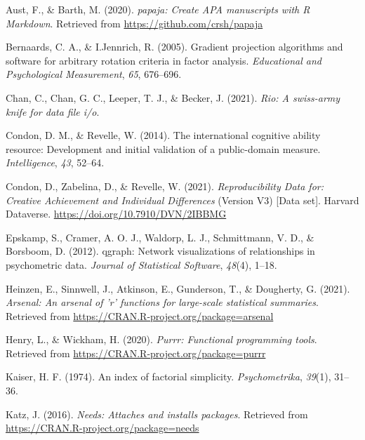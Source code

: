 \documentclass[
  english,
  man]{apa6}
\newlength{\cslhangindent}
\newlength{\cslentryspacingunit} %
\newenvironment{CSLReferences}[2] %
 {%
  \setlength{\parindent}{0pt}
  \ifodd #1
  \let\oldpar\par
  \def\par{\hangindent=\cslhangindent\oldpar}
  \fi
  \setlength{\parskip}{#2\cslentryspacingunit}
 }%
 {}
\begin{document}
\hypertarget{refs}{}
\begin{CSLReferences}{1}{0}
\leavevmode{}%
Aust, F., \& Barth, M. (2020). \emph{{papaja}: {Create} {APA} manuscripts with {R Markdown}}. Retrieved from \url{https://github.com/crsh/papaja}

\leavevmode{}%
Bernaards, C. A., \& I.Jennrich, R. (2005). Gradient projection algorithms and software for arbitrary rotation criteria in factor analysis. \emph{Educational and Psychological Measurement}, \emph{65}, 676--696.

\leavevmode{}%
Chan, C., Chan, G. C., Leeper, T. J., \& Becker, J. (2021). \emph{Rio: A swiss-army knife for data file i/o}.

\leavevmode{}%
Condon, D. M., \& Revelle, W. (2014). The international cognitive ability resource: Development and initial validation of a public-domain measure. \emph{Intelligence}, \emph{43}, 52--64.

\leavevmode{}%
Condon, D., Zabelina, D., \& Revelle, W. (2021). \emph{{Reproducibility Data for: Creative Achievement and Individual Differences}} (Version V3) {[}Data set{]}. Harvard Dataverse. \url{https://doi.org/10.7910/DVN/2IBBMG}

\leavevmode{}%
Epskamp, S., Cramer, A. O. J., Waldorp, L. J., Schmittmann, V. D., \& Borsboom, D. (2012). {qgraph}: Network visualizations of relationships in psychometric data. \emph{Journal of Statistical Software}, \emph{48}(4), 1--18.

\leavevmode{}%
Heinzen, E., Sinnwell, J., Atkinson, E., Gunderson, T., \& Dougherty, G. (2021). \emph{Arsenal: An arsenal of 'r' functions for large-scale statistical summaries}. Retrieved from \url{https://CRAN.R-project.org/package=arsenal}

\leavevmode{}%
Henry, L., \& Wickham, H. (2020). \emph{Purrr: Functional programming tools}. Retrieved from \url{https://CRAN.R-project.org/package=purrr}

\leavevmode{}%
Kaiser, H. F. (1974). An index of factorial simplicity. \emph{Psychometrika}, \emph{39}(1), 31--36.

\leavevmode{}%
Katz, J. (2016). \emph{Needs: Attaches and installs packages}. Retrieved from \url{https://CRAN.R-project.org/package=needs}


\end{CSLReferences}
\end{document}
